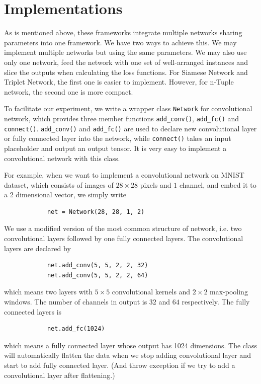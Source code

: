 \documentclass[10pt,twocolumn,letterpaper]{article}
\begin{document}
	\section{Implementations \label{sec:Impl}}
		As is mentioned above, these frameworks integrate multiple networks sharing parameters into one framework. We have two ways to achieve this. We may implement multiple networks but using the same parameters. We may also use only one network, feed the network with one set of well-arranged instances and slice the outputs when calculating the loss functions. For Siamese Network and Triplet Network, the first one is easier to implement. However, for n-Tuple network, the second one is more compact.
	
		To facilitate our experiment, we write a wrapper class \verb|Network| for convolutional network, which provides three member functions \verb|add_conv()|, \verb|add_fc()| and \verb|connect()|. \verb|add_conv()| and \verb|add_fc()| are used to declare new convolutional layer or fully connected layer into the network, while \verb|connect()| takes an input placeholder and output an output tensor. It is very easy to implement a convolutional network with this class.
		
		For example, when we want to implement a convolutional network on MNIST dataset, which consists of images of $28 \times 28$ pixels and $1$ channel, and embed it to a 2 dimensional vector, we simply write
		\begin{verbatim}
			net = Network(28, 28, 1, 2)
		\end{verbatim}
		We use a modified version of the most common structure of network, i.e. two convolutional layers followed by one fully connected layers. The convolutional layers are declared by
		\begin{verbatim}
			net.add_conv(5, 5, 2, 2, 32)
			net.add_conv(5, 5, 2, 2, 64)
		\end{verbatim}
		which means two layers with $5\times 5$ convolutional kernels and $2\times 2$ max-pooling windows. The number of channels in output is $32$ and $64$ respectively.
		The fully connected layers is
		\begin{verbatim}
			net.add_fc(1024)
		\end{verbatim}
		which means a fully connected layer whose output has 1024 dimensions. The class will automatically flatten the data when we stop adding convolutional layer and start to add fully connected layer. (And throw exception if we try to add a convolutional layer after flattening.)
		
\end{document}
